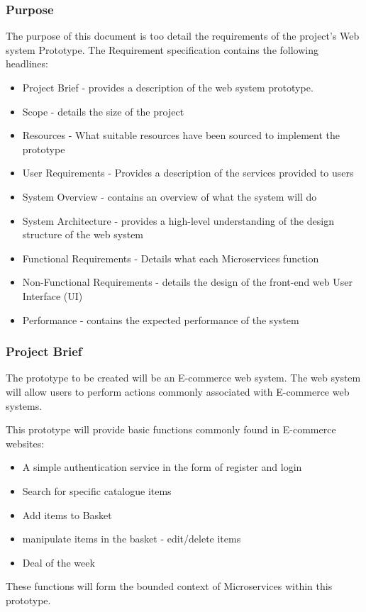 \subsubsection{Purpose}
The purpose of this document is too detail the requirements of the project's Web system Prototype. The Requirement specification contains the following headlines:
\begin{itemize}
	\item Project Brief - provides a description of the web system prototype. %
	\item Scope - details the size of the project
	\item Resources - What suitable resources have been sourced to implement the prototype 
	\item User Requirements - Provides a description of the services provided to users
	\item System Overview - contains an overview of what the system will do
	\item System Architecture - provides a high-level understanding of the design structure of the web system
	\item Functional Requirements - Details what each Microservices function
	\item Non-Functional Requirements - details the design of the front-end web User Interface (UI)
	\item Performance - contains the expected performance of the system
\end{itemize}
\subsubsection{Project Brief}
The prototype to be created will be an E-commerce web system. The web system will allow users to perform actions commonly associated with E-commerce web systems.

This prototype will provide basic functions commonly found in E-commerce websites:
\begin{itemize}
	\item A simple authentication service in the form of register and login
	\item Search for specific catalogue items
	\item Add items to Basket 
	\item manipulate items in the basket - edit/delete items
	\item Deal of the week
\end{itemize}
These functions will form the bounded context of Microservices within this prototype.

